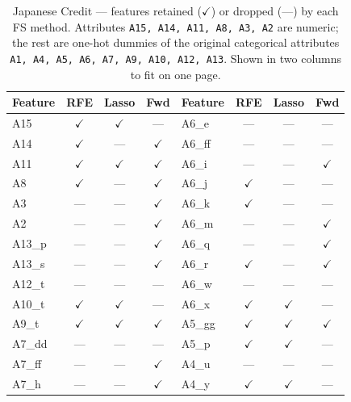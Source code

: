 \begin{table}[H]
\centering
\caption{Japanese Credit --- features retained ($\checkmark$) or
dropped (---) by each FS method.  Attributes \texttt{A15, A14, A11,
A8, A3, A2} are numeric; the rest are one-hot dummies of the original
categorical attributes \texttt{A1, A4, A5, A6, A7, A9, A10, A12,
A13}.  Shown in two columns to fit on one page.}
\singlespacing
\label{tab:fs-jap}
\scriptsize
\begin{tabular}{l c c c | l c c c}
\toprule
\textbf{Feature} & \textbf{RFE} & \textbf{Lasso} & \textbf{Fwd}
& \textbf{Feature} & \textbf{RFE} & \textbf{Lasso} & \textbf{Fwd}\\
\midrule
A15   & $\checkmark$ & $\checkmark$ & ---          & A6\_e   & ---          & ---          & ---\\
A14   & $\checkmark$ & ---          & $\checkmark$ & A6\_ff  & ---          & ---          & ---\\
A11   & $\checkmark$ & $\checkmark$ & $\checkmark$ & A6\_i   & ---          & ---          & $\checkmark$\\
A8    & $\checkmark$ & ---          & $\checkmark$ & A6\_j   & $\checkmark$ & ---          & ---\\
A3    & ---          & ---          & $\checkmark$ & A6\_k   & $\checkmark$ & ---          & ---\\
A2    & ---          & ---          & $\checkmark$ & A6\_m   & ---          & ---          & $\checkmark$\\
A13\_p & ---         & ---          & $\checkmark$ & A6\_q   & ---          & ---          & $\checkmark$\\
A13\_s & ---         & ---          & $\checkmark$ & A6\_r   & $\checkmark$ & ---          & $\checkmark$\\
A12\_t & ---         & ---          & ---          & A6\_w   & ---          & ---          & ---\\
A10\_t & $\checkmark$ & $\checkmark$ & ---          & A6\_x   & $\checkmark$ & $\checkmark$ & ---\\
A9\_t & $\checkmark$ & $\checkmark$ & $\checkmark$ & A5\_gg  & $\checkmark$ & $\checkmark$ & $\checkmark$\\
A7\_dd & ---         & ---          & ---          & A5\_p   & $\checkmark$ & $\checkmark$ & ---\\
A7\_ff & ---         & ---          & $\checkmark$ & A4\_u   & ---          & ---          & ---\\
A7\_h & ---          & ---          & $\checkmark$ & A4\_y   & $\checkmark$ & $\checkmark$ & ---\\

\end{tabular}
\end{table}

